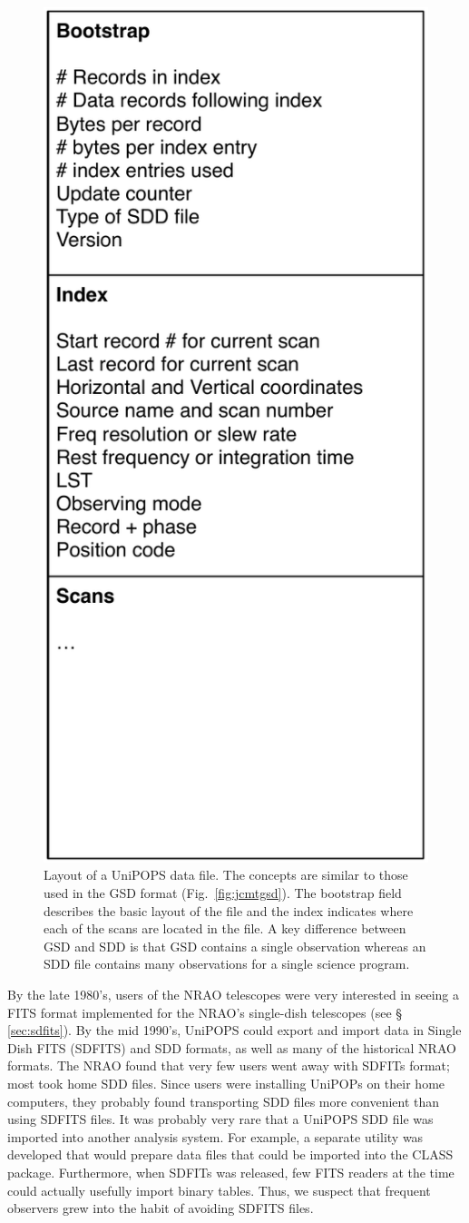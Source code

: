 \documentclass[final,authoryear,5p,times,twocolumn]{elsarticle}
\begin{document}
\begin{figure}[t]
\begin{center}
\includegraphics[width=0.5\columnwidth]{sdd-file-layout}
\end{center}
\caption{Layout of a UniPOPS data file. The concepts are similar to
  those used in the GSD format (Fig.~\ref{fig:jcmtgsd}). The bootstrap
  field describes the basic layout of the file and the index indicates
  where each of the scans are located in the file. A key difference
  between GSD and SDD is that GSD contains a single observation
  whereas an SDD file contains many observations for a single science
  program.}
\label{fig:nraosdd}
\end{figure}

By the late 1980's, users of the NRAO telescopes were very interested
in seeing a FITS format implemented for the NRAO's single-dish
telescopes (see \S\,\ref{sec:sdfits}). By the mid 1990's,
UniPOPS could export and import data in Single Dish FITS (SDFITS) and
SDD formats, as well as many
of the historical NRAO formats.  The NRAO found that very few users
went away with SDFITs format; most took home SDD files.  Since
users were installing UniPOPs on their home computers, they probably
found transporting SDD files more convenient than using
SDFITS files.  It was probably very rare that a UniPOPS SDD file was
imported into another analysis system.  For example, a separate
utility was developed that would prepare data files that could be
imported into the {\textsc CLASS} package.
Furthermore, when SDFITs was released, few FITS readers at the
time could actually usefully import binary tables.  Thus, we suspect
that frequent observers grew into the habit of avoiding SDFITS files.
\end{document}
